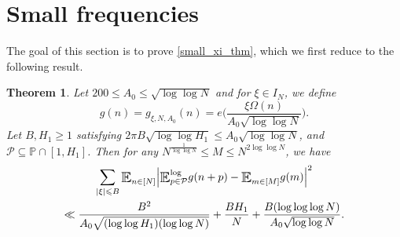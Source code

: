 \documentclass[letter,11pt]{article}
\theoremstyle{plain} %
\newtheorem{theorem}{Theorem}[section]
\theoremstyle{definition} %
\theoremstyle{plain}
\theoremstyle{plain}
\theoremstyle{plain}
\numberwithin{equation}{section}
\renewcommand{\leq}{\leqslant}
\renewcommand{\geq}{\geqslant}
\renewcommand{\P}{\mathbb{P}}
\renewcommand{\subset}{\subseteq}
\newcommand{\E}{\raisebox{-0.4ex}{\scalebox{1.4}[1.3]{$\mathbb{E}$}}}
\newcommand{\Esub}[1]{\raisebox{-0.4ex}{\scalebox{1.4}[1.3]{$\mathbb{E}$}}\raisebox{-0.35ex}{\ensuremath{_{\scriptstyle #1}}}}
\newcommand{\logE}{{\E}^{\log}}
\newcommand{\1}{\mathbbm{1}}
\newcommand{\Pc}{\mathcal{P}}
\begin{document}
\section{Small frequencies}\label{small_xi_section}

The goal of this section is to prove \cref{small_xi_thm}, which we first reduce to the following result.

\begin{theorem}\label{small_xi_Cesaro_thm}
Let $200\leq A_0 \leq \sqrt{\log\log{N}}$ and for $\xi\in I_N$, we define 
$$g(n) = g_{\xi,N,A_0}(n) = e\bigg(\frac{\xi\Omega(n)}{A_0\sqrt{\log\log{N}}}\bigg).$$
Let $B,H_1\geq 1$ satisfying $2\pi B\sqrt{\log\log{H_1}}\leq A_0\sqrt{\log\log{N}}$, and $\Pc\subset\P\cap[1,H_1]$.
Then for any $N^{\frac{1}{\log\log{N}}}\leq M\leq N^{2\log\log{N}}$, we have
\begin{multline*}
    \sum_{|\xi|\leq B} \Esub{n\in[N]}\Big|\logE_{p\in\Pc}g(n+p)-\Esub{m\in[M]}g(m)\Big|^2 \\
    \ll
    \frac{B^2}{A_0\sqrt{(\log\log{H_1})(\log\log{N})}} + \frac{BH_1}{N} + \frac{B(\log\log\log N)}{A_0\sqrt{\log\log{N}}}.
\end{multline*}
\end{theorem}
\end{document}

